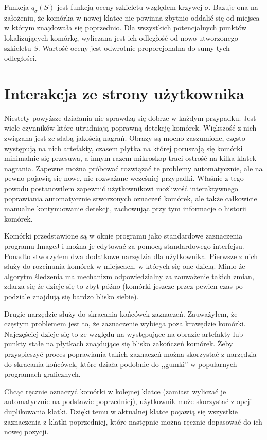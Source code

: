 \documentclass[declaration,shortabstract,mgr]{iithesis}
\begin{document}
Funkcja $q_\sigma(S)$ jest funkcją oceny szkieletu względem krzywej $\sigma$. Bazuje ona na założeniu, że komórka w nowej klatce nie powinna zbytnio oddalić się od miejsca w którym znajdowała się poprzednio.
Dla wszystkich potencjalnych punktów lokalizujących komórkę, wyliczana jest ich odległość od nowo utworzonego szkieletu $S$. Wartość oceny jest odwrotnie proporcjonalna do sumy tych odległości.

\section{Interakcja ze strony użytkownika}

Niestety powyższe działania nie sprawdzą się dobrze w każdym przypadku.
Jest wiele czynników które utrudniają poprawną detekcję komórek.
Większość z nich związana jest ze słabą jakością nagrań.
Obrazy są mocno zaszumione, często występują na nich artefakty, czasem płytka na której poruszają się komórki minimalnie się przesuwa, a innym razem mikroskop traci ostrość na kilka klatek nagrania.
Zapewne można próbować rozwiązać te problemy automatycznie, ale na pewno pojawią się nowe, nie rozważane wcześniej przypadki.
Właśnie z tego powodu postanowiłem zapewnić użytkownikowi możliwość interaktywnego poprawiania automatycznie stworzonych oznaczeń komórek, ale także całkowicie manualne kontynuowanie detekcji, zachowując przy tym informacje o historii komórek.

Komórki przedstawione są w oknie programu jako standardowe zaznaczenia programu ImageJ i można je edytować za pomocą standardowego interfejsu.
Ponadto stworzyłem dwa dodatkowe narzędzia dla użytkownika.
Pierwsze z nich służy do rozcinania komórek w miejscach, w których się one dzielą.
Mimo że algorytm śledzenia ma mechanizm odpowiedzialny za zauważenie takich zmian, zdarza się że dzieje się to zbyt późno (komórki jeszcze przez pewien czas po podziale znajdują się bardzo blisko siebie).

Drugie narzędzie służy do skracania końcówek zaznaczeń.
Zauważyłem, że częstym problemem jest to, że zaznaczenie wybiega poza krawędzie komórki.
Najczęściej dzieje się to ze względu na występujące na obrazie artefakty lub punkty stałe na płytkach znajdujące się blisko zakończeń komórek.
Żeby przyspieszyć proces poprawiania takich zaznaczeń można skorzystać z narzędzia do skracania końcówek, które działa podobnie do ,,gumki'' w popularnych programach graficznych.

Chcąc ręcznie oznaczyć komórki w kolejnej klatce (zamiast wyliczać je automatycznie na podstawie poprzedniej), użytkownik może skorzystać z opcji duplikowania klatki. Dzięki temu w aktualnej klatce pojawią się wszystkie zaznaczenia z klatki poprzedniej, które następnie można ręcznie dopasować do ich nowej pozycji.
\end{document}
